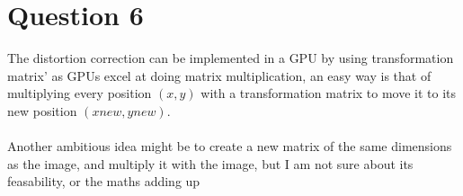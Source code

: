 \documentclass[11pt]{article}
\begin{document}
\section{Question 6}
The distortion correction can be implemented in a GPU by using transformation matrix' as GPUs excel at doing matrix multiplication, an easy way is that of multiplying every position $(x,y)$ with a transformation matrix to move it to its new position $(xnew,ynew)$.\\\\
Another ambitious idea might be to create a new matrix of the same dimensions as the image, and multiply it with the image, but I am not sure about its feasability, or the maths adding up

\end{document}
